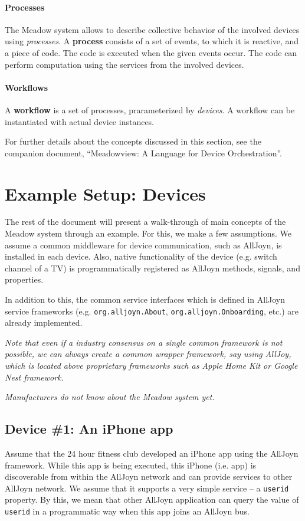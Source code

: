 \documentclass{note}
\begin{document}
\paragraph{Processes}
The Meadow system allows to describe collective behavior of the involved
devices using {\em processes\/}. 
A \textcolor{blue2}{\bf process} consists of a set of events, to which it is
reactive, and a piece of code. The code is executed when the given events
occur.  The code can perform computation using the services from the involved
devices. 


\paragraph{Workflows}
A \textcolor{blue2}{\bf{}workflow} is a set of processes, prarameterized by
{\em devices\/}. A workflow can be instantiated with actual device instances.  

For further details about the concepts discussed in this section, see the
companion document, ``\textcolor{blue2}{Meadowview: A Language for Device
  Orchestration}''.


\section{Example Setup: Devices}
The rest of the document will present a walk-through of main concepts of the
Meadow system through an example. 
For this, we make a few assumptions.
\bit
\w We assume a common middleware for device communication, such as
   AllJoyn, is installed in each device.
   Also, native functionality of the device (e.g. switch channel of a TV) is
   programmatically registered as AllJoyn methods, signals, and properties.
  
   In addition to this, the common service interfaces which is defined in
   AllJoyn service frameworks (e.g. \verb+org.alljoyn.About+,
   \verb+org.alljoyn.Onboarding+, etc.) are already implemented. 

   \textcolor{red2}{\em Note that even if a industry consensus on a single common framework is not
   possible, we can always create a common wrapper framework, say using
   AllJoy,  which is located above proprietary frameworks such as
   Apple Home 
   Kit or Google Nest framework.\/}
   
\w \textcolor{red2}{\em Manufacturers do not know about the Meadow
  system yet.\/}  
\eit

\subsection{Device \#1: An iPhone app}
Assume that the 24 hour fitness club developed an iPhone app using the AllJoyn
framework. While this app is being executed, this iPhone (i.e. app) is
discoverable from within the AllJoyn network and can provide services to other
AllJoyn network. We assume that it supports a very simple service -- a
\verb+userid+ property.
By this, we mean that other AllJoyn application can query the value of
\verb+userid+ in a programmatic way when this app joins an AllJoyn bus. 
\end{document}
